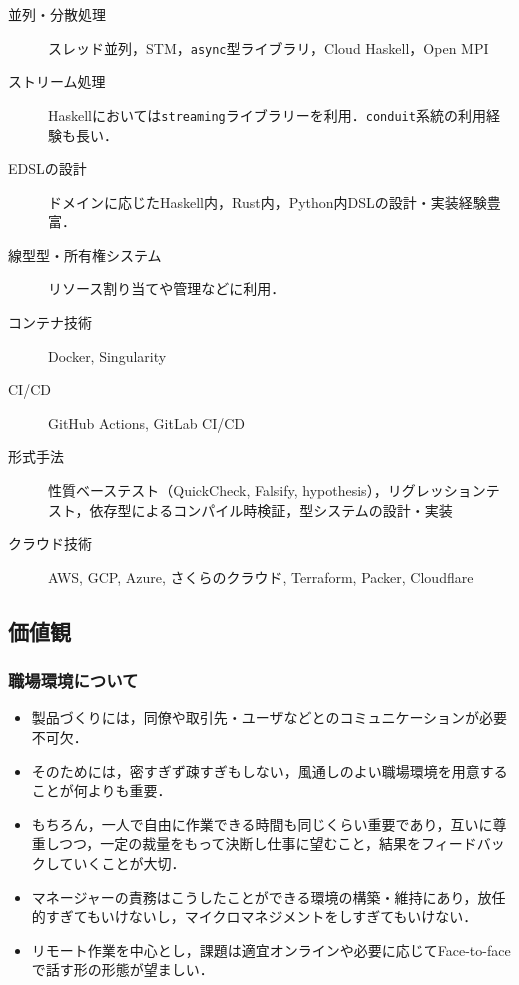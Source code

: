 \documentclass[a4j]{ltjsarticle}
\begin{document}
\begin{description}
  \item[並列・分散処理] スレッド並列，STM，\texttt{async}型ライブラリ，Cloud Haskell，Open MPI
  \item[ストリーム処理] Haskellにおいては\texttt{streaming}ライブラリーを利用．\texttt{conduit}系統の利用経験も長い．
  \item[EDSLの設計] ドメインに応じたHaskell内，Rust内，Python内DSLの設計・実装経験豊富．
  \item[線型型・所有権システム] リソース割り当てや管理などに利用．
  \item[コンテナ技術] Docker, Singularity
  \item[CI/CD] GitHub Actions, GitLab CI/CD
  \item[形式手法] 性質ベーステスト（QuickCheck, Falsify, hypothesis），リグレッションテスト，依存型によるコンパイル時検証，型システムの設計・実装
  \item[クラウド技術] AWS, GCP, Azure, さくらのクラウド, Terraform, Packer, Cloudflare
\end{description}

\subsection*{価値観}

\subsubsection*{職場環境について}
\begin{itemize}
  \item 製品づくりには，同僚や取引先・ユーザなどとのコミュニケーションが必要不可欠．
  \item そのためには，密すぎず疎すぎもしない，風通しのよい職場環境を用意することが何よりも重要．
  \item もちろん，一人で自由に作業できる時間も同じくらい重要であり，互いに尊重しつつ，一定の裁量をもって決断し仕事に望むこと，結果をフィードバックしていくことが大切．
  \item マネージャーの責務はこうしたことができる環境の構築・維持にあり，放任的すぎてもいけないし，マイクロマネジメントをしすぎてもいけない．
  \item リモート作業を中心とし，課題は適宜オンラインや必要に応じてFace-to-faceで話す形の形態が望ましい．
\end{itemize}
\end{document}
